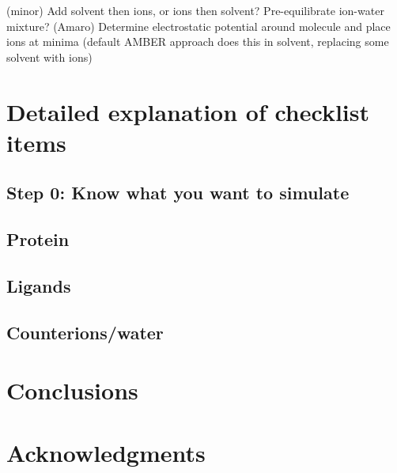 \documentclass[9pt,bestpractices]{livecoms}
\begin{document}
(minor) Add solvent then ions, or ions then solvent? Pre-equilibrate ion-water mixture? (Amaro)
Determine electrostatic potential around molecule and place ions at minima (default AMBER approach does this in solvent, replacing some solvent with ions)



\section{Detailed explanation of checklist items}

\subsection{ Step 0: Know what you want to simulate }
\subsection{Protein}



\subsection{Ligands}



\subsection{Counterions/water}


\section{Conclusions}


\section{Acknowledgments}
\end{document}
